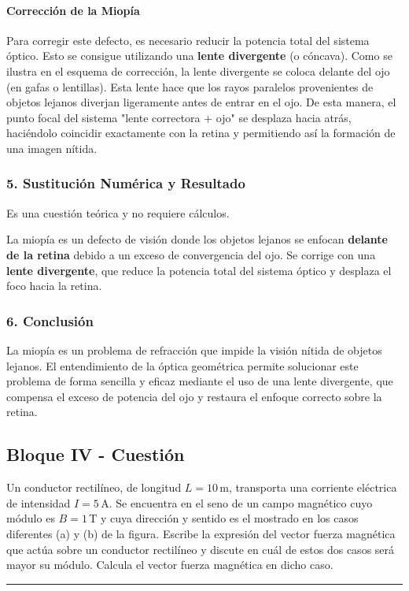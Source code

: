 \paragraph*{Corrección de la Miopía}
Para corregir este defecto, es necesario reducir la potencia total del sistema óptico. Esto se consigue utilizando una \textbf{lente divergente} (o cóncava).
Como se ilustra en el esquema de corrección, la lente divergente se coloca delante del ojo (en gafas o lentillas). Esta lente hace que los rayos paralelos provenientes de objetos lejanos diverjan ligeramente antes de entrar en el ojo. De esta manera, el punto focal del sistema "lente correctora + ojo" se desplaza hacia atrás, haciéndolo coincidir exactamente con la retina y permitiendo así la formación de una imagen nítida.

\subsubsection*{5. Sustitución Numérica y Resultado}
Es una cuestión teórica y no requiere cálculos.
\begin{cajaresultado}
La miopía es un defecto de visión donde los objetos lejanos se enfocan \textbf{delante de la retina} debido a un exceso de convergencia del ojo. Se corrige con una \textbf{lente divergente}, que reduce la potencia total del sistema óptico y desplaza el foco hacia la retina.
\end{cajaresultado}

\subsubsection*{6. Conclusión}
\begin{cajaconclusion}
La miopía es un problema de refracción que impide la visión nítida de objetos lejanos. El entendimiento de la óptica geométrica permite solucionar este problema de forma sencilla y eficaz mediante el uso de una lente divergente, que compensa el exceso de potencia del ojo y restaura el enfoque correcto sobre la retina.
\end{cajaconclusion}

\newpage

\subsection{Bloque IV - Cuestión}
\label{subsec:B4_2014_jul_ext}

\begin{cajaenunciado}
Un conductor rectilíneo, de longitud $L=10\,\text{m}$, transporta una corriente eléctrica de intensidad $I=5\,\text{A}$. Se encuentra en el seno de un campo magnético cuyo módulo es $B=1\,\text{T}$ y cuya dirección y sentido es el mostrado en los casos diferentes (a) y (b) de la figura. Escribe la expresión del vector fuerza magnética que actúa sobre un conductor rectilíneo y discute en cuál de estos dos casos será mayor su módulo. Calcula el vector fuerza magnética en dicho caso. 
\end{cajaenunciado}
\hrule

